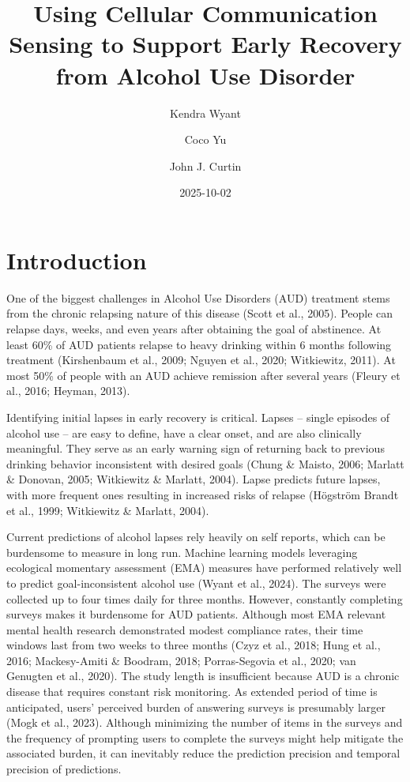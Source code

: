 \documentclass[
  letterpaper,
  DIV=11,
  numbers=noendperiod]{scrartcl}
\title{Using Cellular Communication Sensing to Support Early Recovery
from Alcohol Use Disorder}
\author{Kendra Wyant \and Coco Yu \and John J. Curtin}
\date{2025-10-02}
\begin{document}
\maketitle


\section{Introduction}\label{introduction}

One of the biggest challenges in Alcohol Use Disorders (AUD) treatment
stems from the chronic relapsing nature of this disease (Scott et al.,
2005). People can relapse days, weeks, and even years after obtaining
the goal of abstinence. At least 60\% of AUD patients relapse to heavy
drinking within 6 months following treatment (Kirshenbaum et al., 2009;
Nguyen et al., 2020; Witkiewitz, 2011). At most 50\% of people with an
AUD achieve remission after several years (Fleury et al., 2016; Heyman,
2013).

Identifying initial lapses in early recovery is critical. Lapses --
single episodes of alcohol use -- are easy to define, have a clear
onset, and are also clinically meaningful. They serve as an early
warning sign of returning back to previous drinking behavior
inconsistent with desired goals (Chung \& Maisto, 2006; Marlatt \&
Donovan, 2005; Witkiewitz \& Marlatt, 2004). Lapse predicts future
lapses, with more frequent ones resulting in increased risks of relapse
(Högström Brandt et al., 1999; Witkiewitz \& Marlatt, 2004).

Current predictions of alcohol lapses rely heavily on self reports,
which can be burdensome to measure in long run. Machine learning models
leveraging ecological momentary assessment (EMA) measures have performed
relatively well to predict goal-inconsistent alcohol use (Wyant et al.,
2024). The surveys were collected up to four times daily for three
months. However, constantly completing surveys makes it burdensome for
AUD patients. Although most EMA relevant mental health research
demonstrated modest compliance rates, their time windows last from two
weeks to three months (Czyz et al., 2018; Hung et al., 2016;
Mackesy-Amiti \& Boodram, 2018; Porras-Segovia et al., 2020; van
Genugten et al., 2020). The study length is insufficient because AUD is
a chronic disease that requires constant risk monitoring. As extended
period of time is anticipated, users' perceived burden of answering
surveys is presumably larger (Mogk et al., 2023). Although minimizing
the number of items in the surveys and the frequency of prompting users
to complete the surveys might help mitigate the associated burden, it
can inevitably reduce the prediction precision and temporal precision of
predictions.
\end{document}
